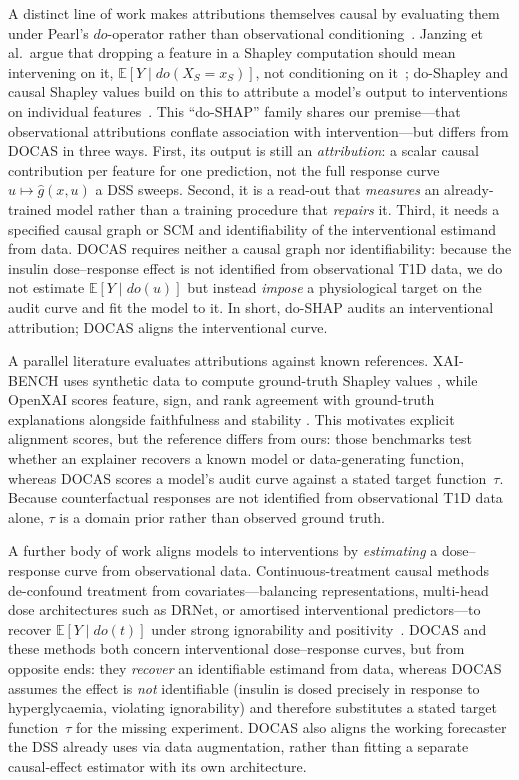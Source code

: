 \documentclass[a4paper,fleqn]{cas-sc}
\begin{document}
A distinct line of work makes attributions themselves causal by evaluating
them under Pearl's $do$-operator rather than observational
conditioning~\citep{pearl2009causality}. Janzing et al.\ argue that dropping a
feature in a Shapley computation should mean intervening on it,
$\mathbb{E}[Y\mid do(X_S=x_S)]$, not conditioning on
it~\citep{janzing2020causal}; do-Shapley and causal Shapley values build on
this to attribute a model's output to interventions on individual
features~\citep{jung2022doshapley,heskes2020causalshap}. This ``do-SHAP''
family shares our premise---that observational attributions conflate
association with intervention---but differs from DOCAS in three ways. First,
its output is still an \emph{attribution}: a scalar causal contribution per
feature for one prediction, not the full response curve $u\mapsto\hat g(x,u)$ a
DSS sweeps. Second, it is a read-out that \emph{measures} an already-trained
model rather than a training procedure that \emph{repairs} it. Third, it needs
a specified causal graph or SCM and identifiability of the interventional
estimand from data. DOCAS requires neither a causal graph nor identifiability:
because the insulin dose--response effect is not identified from observational
T1D data, we do not estimate $\mathbb{E}[Y\mid do(u)]$ but instead \emph{impose}
a physiological target on the audit curve and fit the model to it. In short, do-SHAP audits an
interventional attribution; DOCAS aligns the interventional curve.

A parallel literature evaluates attributions against known references.
XAI-BENCH uses synthetic data to compute ground-truth Shapley values
\citep{liu2021xaibench}, while OpenXAI scores feature, sign, and rank agreement
with ground-truth explanations alongside faithfulness and stability
\citep{agarwal2022openxai}. This motivates explicit alignment scores, but the
reference differs from ours: those benchmarks test whether an explainer
recovers a known model or data-generating function, whereas DOCAS scores a
model's audit curve against a stated target function~$\tau$.
Because counterfactual responses are not identified from observational T1D data
alone, $\tau$ is a domain prior rather than observed ground truth.

A further body of work aligns models to interventions by \emph{estimating} a
dose--response curve from observational data. Continuous-treatment causal
methods de-confound treatment from covariates---balancing representations,
multi-head dose architectures such as DRNet, or amortised interventional
predictors---to recover $\mathbb{E}[Y\mid do(t)]$ under strong ignorability and
positivity~\citep{schwab2020drnet,scholkopf2021}. DOCAS and these methods both
concern interventional dose--response curves, but from opposite ends: they
\emph{recover} an identifiable estimand from data, whereas DOCAS assumes the
effect is \emph{not} identifiable (insulin is dosed precisely in response to
hyperglycaemia, violating ignorability) and therefore substitutes a stated
target function~$\tau$ for the missing experiment. DOCAS also aligns the working
forecaster the DSS already uses via data augmentation, rather than fitting a
separate causal-effect estimator with its own architecture.
\end{document}
